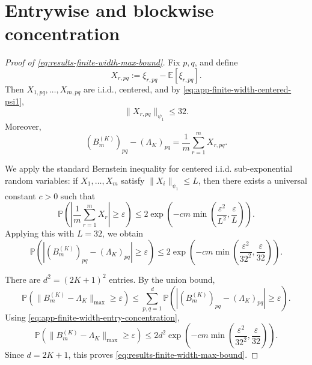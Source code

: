 \section{Entrywise and blockwise concentration}
\label{sec:app-finite-width-concentration}

\begin{proof}[Proof of \eqref{eq:results-finite-width-max-bound}]
	Fix \(p,q\), and define
	\[
		X_{r,pq}:=\xi_{r,pq}-\mathbb E[\xi_{r,pq}].
	\]
	Then \(X_{1,pq},\dots,X_{m,pq}\) are i.i.d., centered, and by
	\eqref{eq:app-finite-width-centered-psi1},
	\[
		\|X_{r,pq}\|_{\psi_1}\le 32.
	\]
	Moreover,
	\[
		(B_m^{(K)})_{pq}-(\Lambda_K)_{pq}
		=
		\frac1m\sum_{r=1}^m X_{r,pq}.
	\]

	We apply the standard Bernstein inequality for centered i.i.d. sub-exponential random
	variables: if \(X_1,\dots,X_m\) satisfy \(\|X_i\|_{\psi_1}\le L\), then there exists a
	universal constant \(c>0\) such that
	\[
		\mathbb P\!\left(
		\left|\frac1m\sum_{r=1}^m X_r\right|\ge \varepsilon
		\right)
		\le
		2\exp\!\left(
		-cm\min\!\left(\frac{\varepsilon^2}{L^2},\frac{\varepsilon}{L}\right)
		\right).
	\]
	Applying this with \(L=32\), we obtain
	\begin{equation}
		\mathbb P\!\left(
		\left|(B_m^{(K)})_{pq}-(\Lambda_K)_{pq}\right|
		\ge \varepsilon
		\right)
		\le
		2\exp\!\left(
		-cm\min\!\left(\frac{\varepsilon^2}{32^2},\frac{\varepsilon}{32}\right)
		\right).
		\label{eq:app-finite-width-entry-concentration}
	\end{equation}

	There are \(d^2=(2K+1)^2\) entries. By the union bound,
	\[
		\mathbb P\!\left(
		\|B_m^{(K)}-\Lambda_K\|_{\max}\ge \varepsilon
		\right)
		\le
		\sum_{p,q=1}^d
		\mathbb P\!\left(
		\left|(B_m^{(K)})_{pq}-(\Lambda_K)_{pq}\right|
		\ge \varepsilon
		\right).
	\]
	Using \eqref{eq:app-finite-width-entry-concentration},
	\[
		\mathbb P\!\left(
		\|B_m^{(K)}-\Lambda_K\|_{\max}\ge \varepsilon
		\right)
		\le
		2d^2
		\exp\!\left(
		-cm\min\!\left(\frac{\varepsilon^2}{32^2},\frac{\varepsilon}{32}\right)
		\right).
	\]
	Since \(d=2K+1\), this proves \eqref{eq:results-finite-width-max-bound}.
\end{proof}

